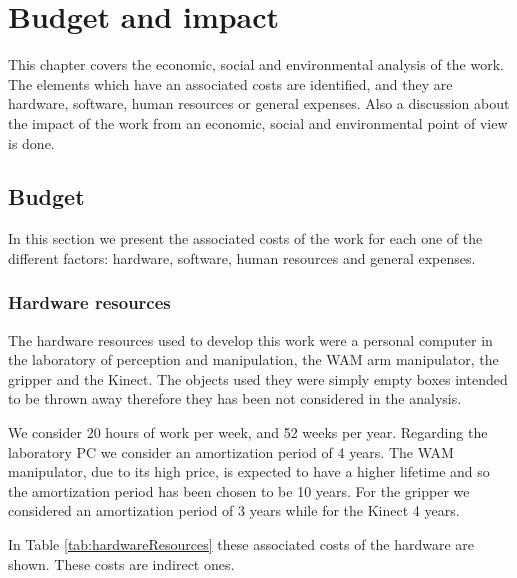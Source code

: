 \chapter{Budget and impact}
\label{ch:budget}
This chapter covers the economic, social and environmental analysis of the work. The elements which have an associated costs are identified, and they are hardware, software, human resources or general expenses. Also a discussion about the impact of the work from an economic, social and environmental point of view is done.

\section{Budget}
In this section we present the associated costs of the work for each one of the different factors: hardware, software, human resources and general expenses.

\subsection*{Hardware resources}
The hardware resources used to develop this work were a personal computer in the laboratory of perception and manipulation, the WAM arm manipulator, the gripper and the Kinect. The objects used they were simply empty boxes intended to be thrown away therefore they has been not considered in the analysis. 

We consider 20 hours of work per week, and 52 weeks per year.
Regarding the laboratory PC we consider an amortization period of 4 years. The WAM manipulator, due to its high price, is expected to have a higher lifetime and so the amortization period has been chosen to be 10 years. For the gripper we considered an amortization period of 3 years while for the Kinect 4 years.

In Table \ref{tab:hardwareResources} these associated costs of the hardware are shown. These costs are indirect ones.


